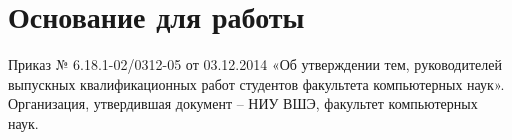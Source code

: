 \chapter*{Основание для работы}

Приказ № 6.18.1-02/0312-05 от 03.12.2014 «Об утверждении тем, руководителей выпускных квалификационных работ студентов факультета компьютерных наук». Организация, утвердившая документ – НИУ ВШЭ, факультет компьютерных наук.
